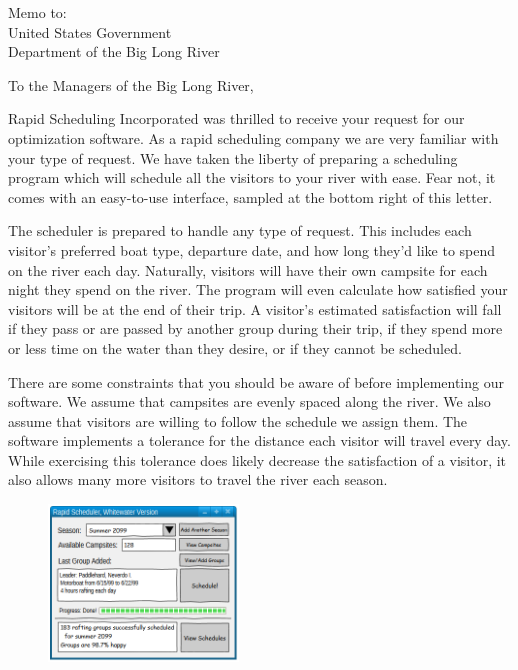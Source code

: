 \documentclass[11pt]{letter} %
\begin{document}
\signature{Rapid Scheduling, Inc.}           %
\longindentation=0pt                       %
\let\raggedleft\raggedright                %


\begin{letter}{Memo to:\\
United States Government\\
Department of the Big Long River}


\vfill %


\opening{To the Managers of the Big Long River,}

Rapid Scheduling Incorporated was thrilled to receive your request for our
optimization software. As a rapid scheduling company we are very familiar
with your type of request. We have taken the liberty of preparing a scheduling
program which will schedule all the visitors to your river with ease. Fear
not, it comes with an easy-to-use interface, sampled at the bottom right of
this letter.

\noindent
The scheduler is prepared to handle any type of request. This includes
each visitor's preferred boat type, departure date, and how long they'd
like to spend on the river each day. Naturally, visitors will have their
own campsite for each night they spend on the river. The program will even
calculate how satisfied your visitors will be at the end of their trip. A
visitor's estimated satisfaction will fall if they pass or are passed by
another group during their trip, if they spend more or less time on the
water than they desire, or if they cannot be scheduled.

\noindent
There are some constraints that you should be aware of before implementing
our software. We assume that campsites are evenly spaced along the river.
We also assume that visitors are willing to follow the schedule we assign
them. The software implements a tolerance for the distance each visitor
will travel every day. While exercising this tolerance does likely decrease the
satisfaction of a visitor, it also allows many more visitors to travel the
river each season.

\begin{figure}
  \begin{center}
    \includegraphics[width=0.45\textwidth]{sampleinterface.png}
  \end{center}
\end{figure}


\end{letter}
\end{document}
